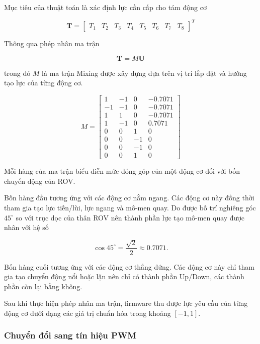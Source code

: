 \documentclass[../DoAn.tex]{subfiles}
\begin{document}
Mục tiêu của thuật toán là xác định lực cần cấp cho tám động cơ

\begin{equation}
\mathbf{T}
=
\begin{bmatrix}
T_1&T_2&T_3&T_4&T_5&T_6&T_7&T_8
\end{bmatrix}^{T}
\end{equation}

Thông qua phép nhân ma trận

\begin{equation}
\mathbf{T}=M\mathbf{U}
\end{equation}

trong đó $M$ là ma trận Mixing được xây dựng dựa trên vị trí lắp đặt và
hướng tạo lực của từng động cơ.

\begin{equation}
M=
\begin{bmatrix}
1&-1&0&-0.7071\\
-1&-1&0&-0.7071\\
1&1&0&-0.7071\\
1&-1&0&0.7071\\
0&0&1&0\\
0&0&-1&0\\
0&0&-1&0\\
0&0&1&0
\end{bmatrix}
\end{equation}

Mỗi hàng của ma trận biểu diễn mức đóng góp của một động cơ đối với bốn
chuyển động của ROV.

Bốn hàng đầu tương ứng với các động cơ nằm ngang. Các động cơ này đồng
thời tham gia tạo lực tiến/lùi, lực ngang và mô-men quay. Do được bố
trí nghiêng góc $45^\circ$ so với trục dọc của thân ROV nên thành phần
lực tạo mô-men quay được nhân với hệ số

\[
\cos45^\circ=\frac{\sqrt2}{2}\approx0.7071.
\]

Bốn hàng cuối tương ứng với các động cơ thẳng đứng. Các động cơ này chỉ
tham gia tạo chuyển động nổi hoặc lặn nên chỉ có thành phần
Up/Down, các thành phần còn lại bằng không.

Sau khi thực hiện phép nhân ma trận, firmware thu được lực yêu cầu của
từng động cơ dưới dạng các giá trị chuẩn hóa trong khoảng $[-1,1]$.

\subsubsection{Chuyển đổi sang tín hiệu PWM}
\end{document}

